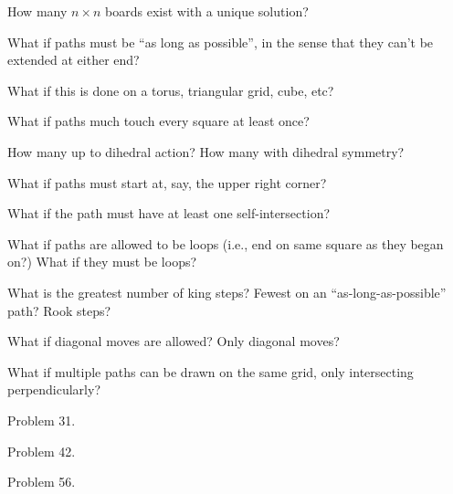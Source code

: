 \documentclass{article}
\begin{document}
\begin{question}
  How many $n \times n$ boards exist with a unique solution?
\end{question}

\begin{related}
  \item What if paths must be ``as long as possible'', in the sense that they
    can't be extended at either end?
  \item What if this is done on a torus, triangular grid, cube, etc?
  \item What if paths much touch every square at least once?
  \item How many up to dihedral action? How many with dihedral symmetry?
  \item What if paths must start at, say, the upper right corner?
  \item What if the path must have at least one self-intersection?
  \item What if paths are allowed to be loops (i.e., end on same square as they
    began on?) What if they must be loops?
  \item What is the greatest number of king steps?
    Fewest on an ``as-long-as-possible'' path? Rook steps?
  \item What if diagonal moves are allowed? Only diagonal moves?
  \item What if multiple paths can be drawn on the same grid, only intersecting perpendicularly?
\end{related}

\begin{references}
  \item Problem 31.
  \item Problem 42.
  \item Problem 56.
\end{references}
\end{document}
